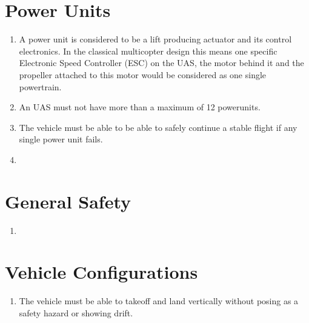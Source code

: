 \documentclass{article}
\begin{document}
\section{Power Units}
\begin{enumerate}
  \item A power unit is considered to be a lift producing actuator and its control electronics. In the classical multicopter design this means one specific Electronic Speed Controller (ESC) on the UAS, the motor behind it and the propeller attached to this motor would be considered as one single powertrain.
  \item An UAS must not have more than a maximum of 12 powerunits.
  \item The vehicle must be able to be able to safely continue a stable flight if any single power unit fails.  
  \item 
\end{enumerate}

\section{General Safety}
\begin{enumerate}
  \item  
\end{enumerate}

\section{Vehicle Configurations}
\begin{enumerate}
  \item The vehicle must be able to takeoff and land vertically without posing as a safety hazard or showing drift.  
\end{enumerate}
\end{document}
